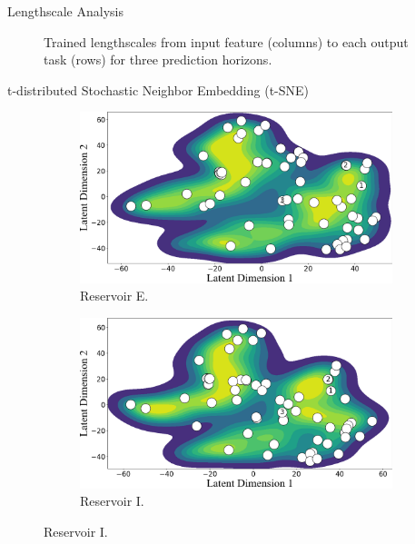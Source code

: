 \begin{frame}{Lengthscale Analysis}
	\begin{figure}[htbp]
		\centering
		\tiny
		\setlength{} 
		\setlength{}
		\subfloat[$H=1.$]{}\hspace{-1.3em}
		\subfloat[$H=14.$]{}\hspace{-1.3em}
		\subfloat[$H=30.$]{}
		\caption{Trained lengthscales from input feature (columns) to each output task (rows) for three prediction horizons.}
	\end{figure}
\end{frame}

\begin{frame}{t-distributed Stochastic Neighbor Embedding (t-SNE)}
	\begin{figure}[htbp]
		\centering
		\begin{subfigure}[t]{0.38\columnwidth}
			\centering
			\includegraphics[width=\columnwidth]{chp_sogp/figures/TSNE_task4_kde_p30.png}
			\caption{Reservoir E.}
		\end{subfigure}
		\hspace{0.05\columnwidth} %
		\begin{subfigure}[t]{0.38\columnwidth}
			\centering
			\includegraphics[width=\columnwidth]{chp_sogp/figures/TSNE_task8_kde_p30.png}
			\caption{Reservoir I.}
		\end{subfigure}
		

\end{figure}
\end{frame}
